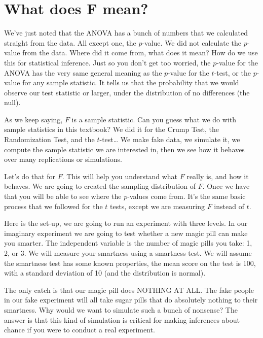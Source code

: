 \documentclass[]{book}
\begin{document}
\hypertarget{what-does-f-mean}{%
\section{What does F mean?}\label{what-does-f-mean}}

We've just noted that the ANOVA has a bunch of numbers that we calculated straight from the data. All except one, the \(p\)-value. We did not calculate the \(p\)-value from the data. Where did it come from, what does it mean? How do we use this for statistical inference. Just so you don't get too worried, the \(p\)-value for the ANOVA has the very same general meaning as the \(p\)-value for the \(t\)-test, or the \(p\)-value for any sample statistic. It tells us that the probability that we would observe our test statistic or larger, under the distribution of no differences (the null).

As we keep saying, \(F\) is a sample statistic. Can you guess what we do with sample statistics in this textbook? We did it for the Crump Test, the Randomization Test, and the \(t\)-test\ldots{} We make fake data, we simulate it, we compute the sample statistic we are interested in, then we see how it behaves over many replications or simulations.

Let's do that for \(F\). This will help you understand what \(F\) really is, and how it behaves. We are going to created the sampling distribution of \(F\). Once we have that you will be able to see where the \(p\)-values come from. It's the same basic process that we followed for the \(t\) tests, except we are measuring \(F\) instead of \(t\).

Here is the set-up, we are going to run an experiment with three levels. In our imaginary experiment we are going to test whether a new magic pill can make you smarter. The independent variable is the number of magic pills you take: 1, 2, or 3. We will measure your smartness using a smartness test. We will assume the smartness test has some known properties, the mean score on the test is 100, with a standard deviation of 10 (and the distribution is normal).

The only catch is that our magic pill does NOTHING AT ALL. The fake people in our fake experiment will all take sugar pills that do absolutely nothing to their smartness. Why would we want to simulate such a bunch of nonsense? The answer is that this kind of simulation is critical for making inferences about chance if you were to conduct a real experiment.
\end{document}
